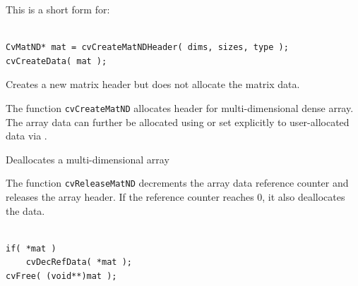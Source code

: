 This is a short form for:

\begin{lstlisting}

CvMatND* mat = cvCreateMatNDHeader( dims, sizes, type );
cvCreateData( mat );

\end{lstlisting}

\label{CreateMatNDHeader}

Creates a new matrix header but does not allocate the matrix data.


\begin{description}
\end{description}

The function \texttt{cvCreateMatND} allocates header for multi-dimensional dense array. The array data can further be allocated using  or set explicitly to user-allocated data via .

\label{ReleaseMatND}

Deallocates a multi-dimensional array


\begin{description}
\end{description}

The function \texttt{cvReleaseMatND} decrements the array data reference counter and releases the array header. If the reference counter reaches 0, it also deallocates the data.

\begin{lstlisting}

if( *mat )
    cvDecRefData( *mat );
cvFree( (void**)mat );

\end{lstlisting}

\label{InitMatNDHeader}

